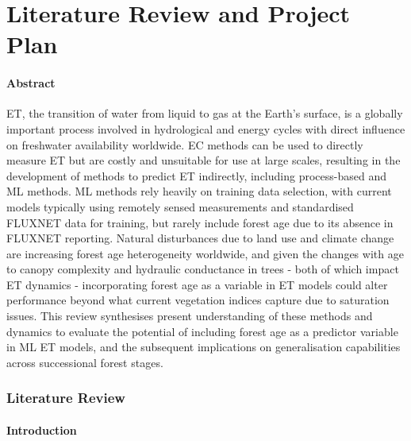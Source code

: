 \part{Literature Review and Project Plan}
\subsection*{Abstract}
\ac{ET}, the transition of water from liquid to gas at the Earth's surface, is a globally important process involved in hydrological and energy cycles with direct influence on freshwater availability worldwide. \ac{EC} methods can be used to directly measure ET but are costly and unsuitable for use at large scales, resulting in the development of methods to predict ET indirectly, including process-based and \ac{ML} methods. ML methods rely heavily on training data selection, with current models typically using remotely sensed measurements and standardised FLUXNET data for training, but rarely include forest age due to its absence in FLUXNET reporting. Natural disturbances due to land use and climate change are increasing forest age heterogeneity worldwide, and given the changes with age to canopy complexity and hydraulic conductance in trees - both of which impact ET dynamics - incorporating forest age as a variable in ET models could alter performance beyond what current vegetation indices capture due to saturation issues. This review synthesises present understanding of these methods and dynamics to evaluate the potential of including forest age as a predictor variable in ML ET models, and the subsequent implications on generalisation capabilities across successional forest stages.

\section{Literature Review}
\subsection{Introduction}
